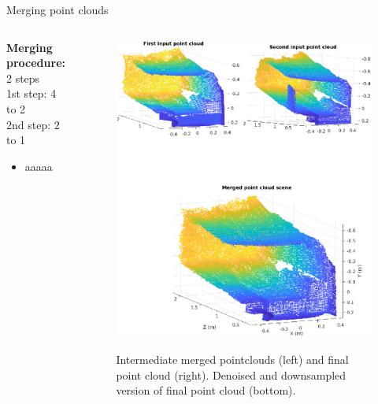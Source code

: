 \documentclass{beamer}
\begin{document}
\begin{frame}{Merging point clouds}

\begin{columns}
	\begin{column}{0.5\textwidth}
\textbf{Merging procedure:} 2 steps\\

1st  step: 4 to 2\\
2nd step: 2 to 1\\

\begin{itemize}
	\item aaaaa
\end{itemize}

	\end{column}
	\begin{column}{0.6\textwidth}  %
		\begin{center}
			\begin{figure}
				\includegraphics[width=0.8\linewidth]{Figures/merge_h.eps}
				\label{merge}
				\caption{ Intermediate merged pointclouds (left) and final point cloud (right). Denoised and downsampled version of final point cloud (bottom).}
			\end{figure}

		\end{center}
	\end{column}
\end{columns}


\end{frame}
\end{document}
